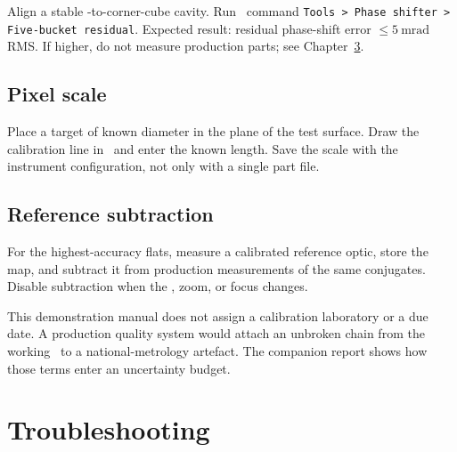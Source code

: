 \resetsteps
\stepn Align a stable \TF-to-corner-cube cavity.
\stepn Run \software\ command \texttt{Tools > Phase shifter > Five-bucket residual}.
\stepn Expected result: residual phase-shift error \(\le \SI{5}{\milli\radian}\) RMS. If higher, do not measure production parts; see Chapter~\ref{ch:trouble}.

\section{Pixel scale}

\resetsteps
\stepn Place a target of known diameter in the plane of the test surface.
\stepn Draw the calibration line in \software\ and enter the known length.
\stepn Save the scale with the instrument configuration, not only with a single part file.

\section{Reference subtraction}

For the highest-accuracy flats, measure a calibrated reference optic, store the map, and subtract it from production measurements of the same conjugates. Disable subtraction when the \TF, zoom, or focus changes.

\begin{notebox}[Traceability]
This demonstration manual does not assign a calibration laboratory or a due date. A production quality system would attach an unbroken chain from the working \TF\ to a national-metrology artefact. The companion report shows how those terms enter an uncertainty budget.
\end{notebox}

\chapter{Troubleshooting}
\label{ch:trouble}

